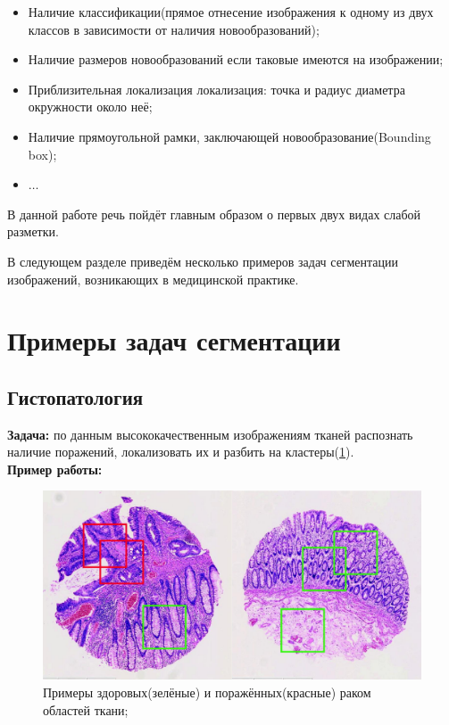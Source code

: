 \begin{itemize}
    \item Наличие классификации(прямое отнесение изображения к одному из двух классов в зависимости от наличия новообразований);
    \item Наличие размеров новообразований если таковые имеются на изображении;
    \item Приблизительная локализация локализация: точка и радиус диаметра окружности около неё;
    \item Наличие прямоугольной рамки, заключающей новообразование(Bounding box);
    \item $\dots$
\end{itemize}

В данной работе речь пойдёт главным образом о первых двух видах слабой разметки.

В следующем разделе приведём несколько примеров задач сегментации изображений, возникающих в медицинской практике.

\section{Примеры задач сегментации}

\subsection{Гистопатология}

{\bf Задача:} по данным высококачественным изображениям тканей распознать наличие поражений, локализовать их и разбить на кластеры(\ref{fig:histo}).
\\
{\bf Пример работы:} \cite{xu_weakly_2014}


\begin{figure}[ht] 
  \center
  \includegraphics [scale=0.27] {images/histo_1.png}
  \caption{Примеры здоровых(зелёные) и поражённых(красные) раком областей ткани; \cite{xu_weakly_2014}} 
  \label{fig:histo}  
\end{figure}



